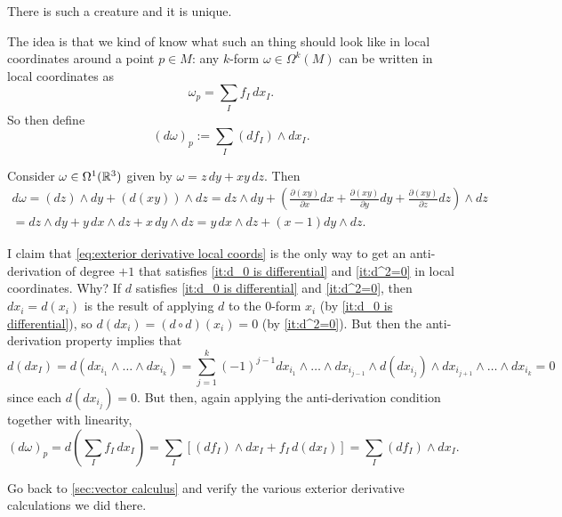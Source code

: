 \begin{proposition}\label{prop:exterior derivative existence and uniqueness}
	There is such a creature and it is unique.
\end{proposition}

The idea is that we kind of know what such an thing should look like in local coordinates around a point $p \in M$: any $k$-form $\omega \in \Omega^k(M)$ can be written in local coordinates as
\[
	\omega_p = \sum_I f_I\, dx_I.
\]
So then define
\begin{equation}\label{eq:exterior derivative local coords}
	(d\omega)_p := \sum_I (df_I) \wedge dx_I.
\end{equation}

\begin{example}\label{ex:1-form in R^3}
	Consider $\omega \in \Omega^1(\mathbb{R}^3)$ given by $\omega = z \, dy + xy \, dz$. Then
	\begin{multline*}
		d\omega = (dz) \wedge dy + (d(xy)) \wedge dz = dz \wedge dy + \left(\frac{\partial (xy)}{\partial x} dx + \frac{\partial (xy)}{\partial y} dy + \frac{\partial (xy)}{\partial z} dz\right) \wedge dz \\
		= dz \wedge dy + y\, dx \wedge dz + x \, dy \wedge dz = y\, dx \wedge dz + (x-1) dy \wedge dz.
	\end{multline*}
\end{example}

I claim that \eqref{eq:exterior derivative local coords} is the only way to get an anti-derivation of degree $+1$ that satisfies \ref{it:d_0 is differential} and \ref{it:d^2=0} in local coordinates. Why? If $d$ satisfies \ref{it:d_0 is differential} and \ref{it:d^2=0}, then $dx_i = d(x_i)$ is the result of applying $d$ to the 0-form $x_i$ (by \ref{it:d_0 is differential}), so $d(dx_i) = (d \circ d)(x_i) = 0$ (by \ref{it:d^2=0}). But then the anti-derivation property implies that
\[
	d(dx_I) = d(dx_{i_1} \wedge \dots \wedge dx_{i_k}) = \sum_{j=1}^k(-1)^{j-1} dx_{i_1} \wedge \dots \wedge dx_{i_{j-1}} \wedge d(dx_{i_j}) \wedge dx_{i_{j+1}} \wedge \dots \wedge dx_{i_k} = 0
\]
since each $d(dx_{i_j}) = 0$. But then, again applying the anti-derivation condition together with linearity,
\[
	(d\omega)_p = d\left(\sum_I f_I\, dx_I\right) = \sum_I \left[ (df_I) \wedge dx_I + f_I\, d(dx_I)\right] = \sum_I (df_I) \wedge dx_I.
\]

\begin{exercise}
	Go back to \cref{sec:vector calculus} and verify the various exterior derivative calculations we did there.
\end{exercise}

